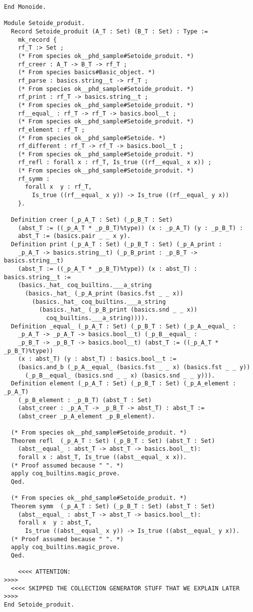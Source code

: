 {\begin{lstlisting}[language=MyCoq]
End Monoide.

Module Setoide_produit.
  Record Setoide_produit (A_T : Set) (B_T : Set) : Type :=
    mk_record {
    rf_T :> Set ;
    (* From species ok__phd_sample#Setoide_produit. *)
    rf_creer : A_T -> B_T -> rf_T ;
    (* From species basics#Basic_object. *)
    rf_parse : basics.string__t -> rf_T ;
    (* From species ok__phd_sample#Setoide_produit. *)
    rf_print : rf_T -> basics.string__t ;
    (* From species ok__phd_sample#Setoide_produit. *)
    rf__equal_ : rf_T -> rf_T -> basics.bool__t ;
    (* From species ok__phd_sample#Setoide_produit. *)
    rf_element : rf_T ;
    (* From species ok__phd_sample#Setoide. *)
    rf_different : rf_T -> rf_T -> basics.bool__t ;
    (* From species ok__phd_sample#Setoide_produit. *)
    rf_refl : forall x : rf_T, Is_true ((rf__equal_ x x)) ;
    (* From species ok__phd_sample#Setoide_produit. *)
    rf_symm :
      forall x  y : rf_T,
        Is_true ((rf__equal_ x y)) -> Is_true ((rf__equal_ y x))
    }.
  
  Definition creer (_p_A_T : Set) (_p_B_T : Set)
    (abst_T := ((_p_A_T * _p_B_T)%type)) (x : _p_A_T) (y : _p_B_T) :
    abst_T := (basics.pair _ _ x y).
  Definition print (_p_A_T : Set) (_p_B_T : Set) (_p_A_print :
    _p_A_T -> basics.string__t) (_p_B_print : _p_B_T -> basics.string__t)
    (abst_T := ((_p_A_T * _p_B_T)%type)) (x : abst_T) : basics.string__t :=
    (basics._hat_ coq_builtins.___a_string
      (basics._hat_ (_p_A_print (basics.fst _ _ x))
        (basics._hat_ coq_builtins.___a_string
          (basics._hat_ (_p_B_print (basics.snd _ _ x))
            coq_builtins.___a_string)))).
  Definition _equal_ (_p_A_T : Set) (_p_B_T : Set) (_p_A__equal_ :
    _p_A_T -> _p_A_T -> basics.bool__t) (_p_B__equal_ :
    _p_B_T -> _p_B_T -> basics.bool__t) (abst_T := ((_p_A_T * _p_B_T)%type))
    (x : abst_T) (y : abst_T) : basics.bool__t :=
    (basics.and_b (_p_A__equal_ (basics.fst _ _ x) (basics.fst _ _ y))
      (_p_B__equal_ (basics.snd _ _ x) (basics.snd _ _ y))).
  Definition element (_p_A_T : Set) (_p_B_T : Set) (_p_A_element : _p_A_T)
    (_p_B_element : _p_B_T) (abst_T : Set)
    (abst_creer : _p_A_T -> _p_B_T -> abst_T) : abst_T :=
    (abst_creer _p_A_element _p_B_element).
  
  (* From species ok__phd_sample#Setoide_produit. *)
  Theorem refl  (_p_A_T : Set) (_p_B_T : Set) (abst_T : Set)
    (abst__equal_ : abst_T -> abst_T -> basics.bool__t):
    forall x : abst_T, Is_true ((abst__equal_ x x)).
  (* Proof assumed because " ". *)
  apply coq_builtins.magic_prove.
  Qed.
  
  (* From species ok__phd_sample#Setoide_produit. *)
  Theorem symm  (_p_A_T : Set) (_p_B_T : Set) (abst_T : Set)
    (abst__equal_ : abst_T -> abst_T -> basics.bool__t):
    forall x  y : abst_T,
      Is_true ((abst__equal_ x y)) -> Is_true ((abst__equal_ y x)).
  (* Proof assumed because " ". *)
  apply coq_builtins.magic_prove.
  Qed.
  
    <<<< ATTENTION:                                                   >>>>
  <<<< SKIPPED THE COLLECTION GENERATOR STUFF THAT WE EXPLAIN LATER >>>>
End Setoide_produit.
\end{lstlisting}
}



